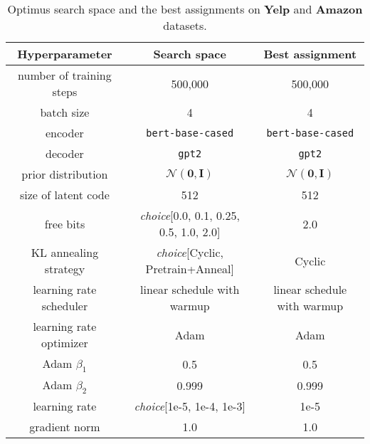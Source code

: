 \documentclass[11pt]{article}
\newcommand{\yelp}{\mbox{\bf Yelp}}
\newcommand{\amazon}{\mbox{\bf Amazon}}
\begin{document}
\begin{table*}[ht]
    \vspace{3mm}\begin{tabular}{ccc}
    \toprule
    \textbf{Hyperparameter} & \textbf{Search space} & \textbf{Best assignment} \\
    \midrule
    number of training steps & 500,000 & 500,000\\
    \midrule
    batch size & 4 & 4\\
    \midrule
    encoder & \texttt{bert-base-cased} & \texttt{bert-base-cased} \\
    \midrule
    decoder & \texttt{gpt2} & \texttt{gpt2}\\
    \midrule
    prior distribution & $\mathcal{N}(\boldsymbol{0}, \boldsymbol{I})$ & $\mathcal{N}(\boldsymbol{0}, \boldsymbol{I})$ \\
    \midrule
    size of latent code & 512 & 512 \\
    \midrule
    free bits & \emph{choice}[0.0, 0.1, 0.25, 0.5, 1.0, 2.0] & 2.0\\
    \midrule
    KL annealing strategy & \emph{choice}[Cyclic, Pretrain+Anneal] & Cyclic\\
    \midrule
    learning rate scheduler & linear schedule with warmup & linear schedule with warmup\\
    \midrule
    learning rate optimizer & Adam & Adam\\
    \midrule
    Adam $\beta_1$ & 0.5 & 0.5\\
    \midrule
    Adam $\beta_2$ & 0.999 & 0.999\\
    \midrule
    learning rate & \emph{choice}[1e-5, 1e-4, 1e-3] & 1e-5 \\
    \midrule
    gradient norm & 1.0 & 1.0 \\
    \bottomrule
    \end{tabular}
    \caption{Optimus search space and the best assignments on \yelp{} and \amazon{} datasets.}
    \label{tab:optimus_param}
\end{table*}
 
\end{document}
